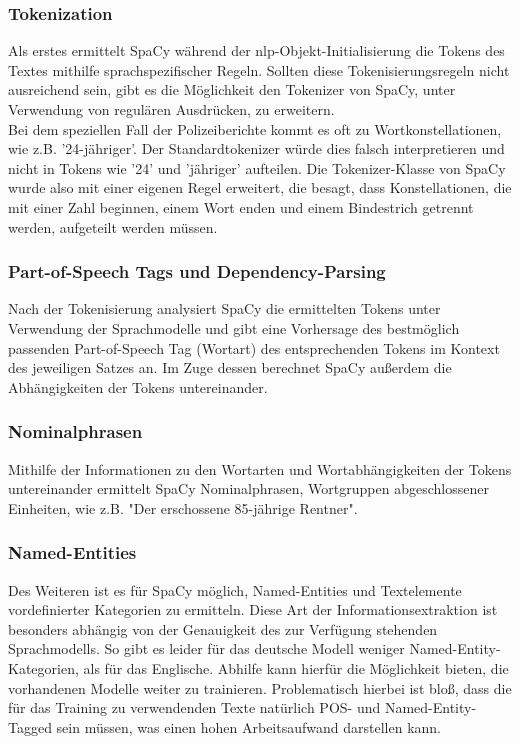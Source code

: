 \subsubsection{Tokenization}
Als erstes ermittelt SpaCy während der nlp-Objekt-Initialisierung die Tokens des Textes mithilfe sprachspezifischer Regeln. Sollten diese Tokenisierungsregeln nicht ausreichend sein, gibt es die Möglichkeit den Tokenizer von SpaCy, unter Verwendung von regulären Ausdrücken, zu erweitern. 
\\Bei dem speziellen Fall der Polizeiberichte kommt es oft zu Wortkonstellationen, wie z.B. '24-jähriger'. Der Standardtokenizer würde dies falsch interpretieren und nicht in Tokens wie '24' und 'jähriger' aufteilen. Die Tokenizer-Klasse von SpaCy wurde also mit einer eigenen Regel erweitert, die besagt, dass Konstellationen, die mit einer Zahl beginnen, einem Wort enden und einem Bindestrich getrennt werden, aufgeteilt werden müssen.

\subsubsection{Part-of-Speech Tags und Dependency-Parsing}
Nach der Tokenisierung analysiert SpaCy die ermittelten Tokens unter Verwendung der Sprachmodelle und gibt eine Vorhersage des bestmöglich passenden Part-of-Speech Tag (Wortart) des entsprechenden Tokens im Kontext des jeweiligen Satzes an. Im Zuge dessen berechnet SpaCy außerdem die Abhängigkeiten der Tokens untereinander.

\subsubsection{Nominalphrasen}
Mithilfe der Informationen zu den Wortarten und Wortabhängigkeiten der Tokens untereinander ermittelt SpaCy Nominalphrasen, Wortgruppen abgeschlossener Einheiten, wie z.B. "Der erschossene 85-jährige Rentner".  

\subsubsection{Named-Entities}
Des Weiteren ist es für SpaCy möglich, Named-Entities und Textelemente vordefinierter Kategorien zu ermitteln. Diese Art der Informationsextraktion ist besonders abhängig von der Genauigkeit des zur Verfügung stehenden Sprachmodells. So gibt es leider für das deutsche Modell weniger Named-Entity-Kategorien, als für das Englische. Abhilfe kann hierfür die Möglichkeit bieten, die vorhandenen Modelle weiter zu trainieren. Problematisch hierbei ist bloß, dass die für das Training zu verwendenden Texte natürlich POS- und Named-Entity-Tagged sein müssen, was einen hohen Arbeitsaufwand darstellen kann.

